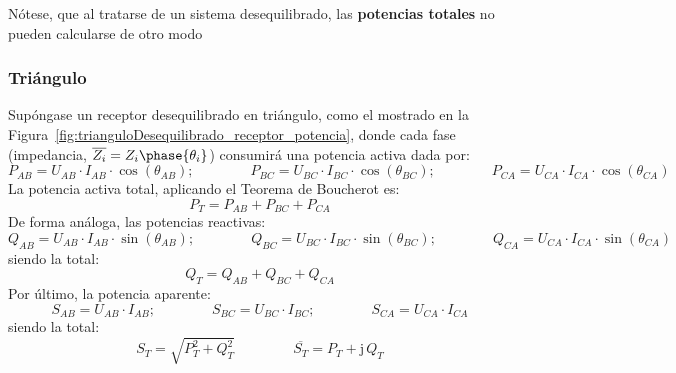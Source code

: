 	\begin{remark}
	    Nótese, que al tratarse de un sistema desequilibrado, las \textbf{potencias totales} no pueden calcularse de otro modo
	\end{remark}
	
	\subsubsection{Triángulo}
	
	Supóngase un receptor desequilibrado en triángulo, como el mostrado en la Figura~\ref{fig:trianguloDesequilibrado_receptor_potencia}, donde cada fase (impedancia, $\overline{Z_i}=Z_i\phase{\theta_i}$) consumirá una potencia activa dada por: 
	\begin{equation*}
	    P_{AB}=U_{AB}\cdot I_{AB} \cdot \cos(\theta_{AB});\qquad \qquad
	    P_{BC}=U_{BC}\cdot I_{BC} \cdot \cos(\theta_{BC});\qquad \qquad
	    P_{CA}=U_{CA}\cdot I_{CA} \cdot \cos(\theta_{CA})
	\end{equation*}
	La potencia activa total, aplicando el Teorema de Boucherot es:
	\begin{equation}
	    \boxed{P_T=P_{AB}+P_{BC}+P_{CA}}
	\end{equation}
	De forma análoga, las potencias reactivas:
	\begin{equation*}
	    Q_{AB}=U_{AB}\cdot I_{AB} \cdot \sin(\theta_{AB});\qquad \qquad
	    Q_{BC}=U_{BC}\cdot I_{BC} \cdot \sin(\theta_{BC});\qquad \qquad
	    Q_{CA}=U_{CA}\cdot I_{CA} \cdot \sin(\theta_{CA})
	\end{equation*}
	siendo la total: 
	\begin{equation}
	    \boxed{Q_T=Q_{AB}+Q_{BC}+Q_{CA}}
	\end{equation}
	Por último, la potencia aparente: 
	\begin{equation*}
	    S_{AB}=U_{AB}\cdot I_{AB};\qquad \qquad
	    S_{BC}=U_{BC}\cdot I_{BC};\qquad \qquad
	    S_{CA}=U_{CA}\cdot I_{CA}
	\end{equation*}
	siendo la total: 
	\begin{equation}
	    \boxed{S_T=\sqrt{P_T^2+Q_T^2}}\,\qquad\qquad \boxed{\overline{S_T}=P_T+\mathrm{j}\,Q_T}
	\end{equation}
	

